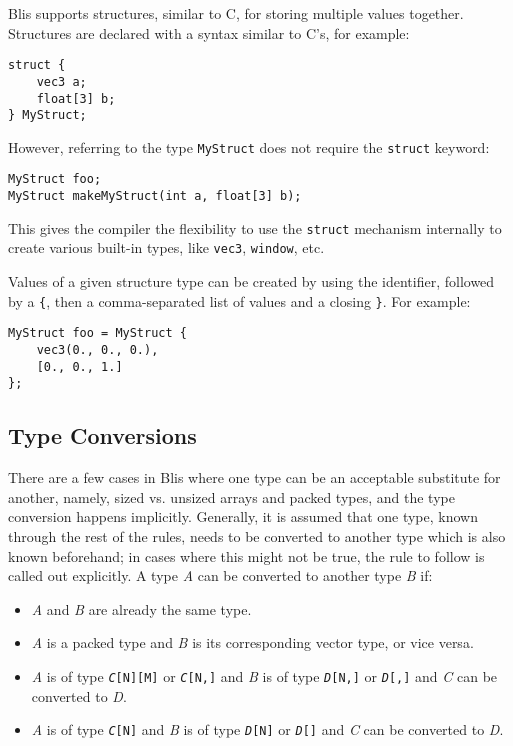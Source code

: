 \documentclass[11pt]{article}
\newcommand{\code}[1]{\texttt{#1}}
\begin{document}
Blis supports structures, similar to C, for storing multiple values together. Structures are declared with a syntax similar to C's, for example:

\begin{lstlisting}
struct {
	vec3 a;
	float[3] b;
} MyStruct;
\end{lstlisting}

However, referring to the type \code{MyStruct} does not require the \code{struct} keyword:

\begin{lstlisting}
MyStruct foo;
MyStruct makeMyStruct(int a, float[3] b);
\end{lstlisting}

This gives the compiler the flexibility to use the \code{struct} mechanism internally to create various built-in types, like \code{vec3}, \code{window}, etc.

Values of a given structure type can be created by using the identifier, followed by a \code{\{}, then a comma-separated list of values and a closing \code{\}}. For example:

\begin{lstlisting}
MyStruct foo = MyStruct {
	vec3(0., 0., 0.),
	[0., 0., 1.]
};
\end{lstlisting}

\subsection{Type Conversions} \label{conversions}

There are a few cases in Blis where one type can be an acceptable substitute for another, namely, sized vs. unsized arrays and packed types, and the type conversion happens implicitly. Generally, it is assumed that one type, known through the rest of the rules, needs to be converted to another type which is also known beforehand; in cases where this might not be true, the rule to follow is called out explicitly. A type \textit{A} can be converted to another type \textit{B} if:

\begin{itemize}
	\item \textit{A} and \textit{B} are already the same type.
	\item \textit{A} is a packed type and \textit{B} is its corresponding vector type, or vice versa.
	\item \textit{A} is of type \code{\textit{C}[N][M]} or \code{\textit{C}[N,]} and \textit{B} is of type \code{\textit{D}[N,]} or \code{\textit{D}[,]} and \textit{C} can be converted to \textit{D}.
	\item \textit{A} is of type \code{\textit{C}[N]} and \textit{B} is of type \code{\textit{D}[N]} or \code{\textit{D}[]} and \textit{C} can be converted to \textit{D}.
\end{itemize}
\end{document}
